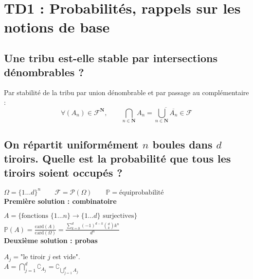 \documentclass[a4paper, 10pt, oneside]{article}
\begin{document}


\newtheorem{theo}{Théorème}
\newtheorem{prop}[theo]{Proposition}
\newtheorem{coro}[theo]{Corollaire}
\newtheorem{lemme}[theo]{Lemme
}
\theoremstyle{definition}
\newtheorem{defi}{Définition}
\newtheorem*{rema}{Remarque}
\newtheorem*{exem}{Exemple}
\newtheorem*{preuve}{Preuve}
\newtheorem*{rappel}{Rappel}
\newtheorem*{appli}{Application}

\section*{TD1 : Probabilités, rappels sur les notions de base}

\subsection{Une tribu est-elle stable par intersections dénombrables ?}

Par stabilité de la tribu par union dénombrable et par passage au complémentaire :
$$
\forall(A_n)\in\mathcal{F}^\mathbf{N},\qquad\bigcap_{n\in\mathbf{N}}A_n=\overline{\bigcup_{n\in\mathbf{N}}\overline{A_n}}\in\mathcal{F} 
$$

\subsection{On répartit uniformément \texorpdfstring{$n$}{TEXT} boules dans \texorpdfstring{$d$}{TEXT} tiroirs. Quelle est la probabilité que tous les tiroirs soient occupés ?}

$\Omega=\{1\ldots d\}^n\qquad \mathcal{F}=\mathcal{P}(\Omega)\qquad\mathbb{P}=\text{équiprobabilité}$\\


\textbf{Première solution : combinatoire}

$A=\{\text{fonctions }\{1\ldots n\}\xrightarrow[]{}\{1\ldots d\}\text{ surjectives}\}$\\

$\mathbb{P}(A)=\frac{\text{card}(A)}{\text{card}(\Omega)}=\frac{\sum_{k=0}^d(-1)^{d-k}{d\choose k} k^n}{d^n}$\\

\textbf{Deuxième solution : probas}

$A_j=$"le tiroir $j$ est vide".\\

$A=\bigcap_{j=1}^d\complement_{A_j}=\complement_{\bigcup_{j=1}^dA_j}$\\
\end{document}
